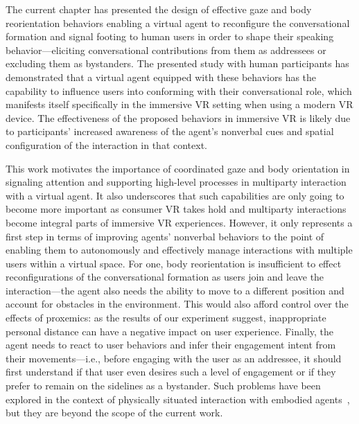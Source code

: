 The current chapter has presented the design of effective gaze and body reorientation behaviors enabling a virtual agent to reconfigure the conversational formation and signal footing to human users in order to shape their speaking behavior---eliciting conversational contributions from them as addressees or excluding them as bystanders. The presented study with human participants has demonstrated that a virtual agent equipped with these behaviors has the capability to influence users into conforming with their conversational role, which manifests itself specifically in the immersive VR setting when using a modern VR device. The effectiveness of the proposed behaviors in immersive VR is likely due to participants' increased awareness of the agent's nonverbal cues and spatial configuration of the interaction in that context.

This work motivates the importance of coordinated gaze and body orientation in signaling attention and supporting high-level processes in multiparty interaction with a virtual agent. It also underscores that such capabilities are only going to become more important as consumer VR takes hold and multiparty interactions become integral parts of immersive VR experiences. However, it only represents a first step in terms of improving agents' nonverbal behaviors to the point of enabling them to autonomously and effectively manage interactions with multiple users within a virtual space. For one, body reorientation is insufficient to effect reconfigurations of the conversational formation as users join and leave the interaction---the agent also needs the ability to move to a different position and account for obstacles in the environment. This would also afford control over the effects of proxemics: as the results of our experiment suggest, inappropriate personal distance can have a negative impact on user experience. Finally, the agent needs to react to user behaviors and infer their engagement intent from their movements---i.e., before engaging with the user as an addressee, it should first understand if that user even desires such a level of engagement or if they prefer to remain on the sidelines as a bystander. Such problems have been explored in the context of physically situated interaction with embodied agents~\citep{bohus2009models}, but they are beyond the scope of the current work.